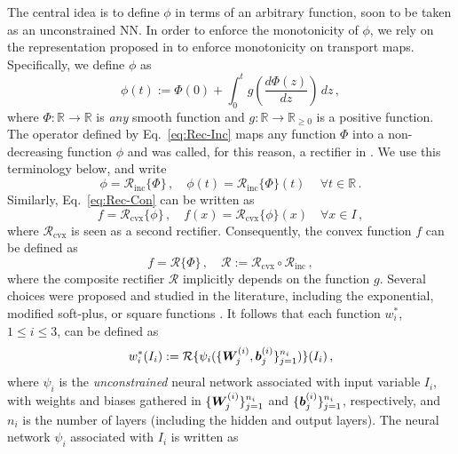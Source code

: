 The central idea is to define $\phi$ in terms of an arbitrary function, soon to be taken as an unconstrained NN. In order to enforce the monotonicity of $\phi$, we rely on the representation proposed in \cite{baptista2020adaptive} to enforce monotonicity on transport maps. Specifically, we define $\phi$ as
\begin{equation}\label{eq:Rec-Inc}
    \phi(t) := \Phi(0) + \int_{0}^{t} g\left(\frac{d\Phi(z)}{dz}\right)\,dz\,,
\end{equation}
where $\Phi:\mathbb{R} \to \mathbb{R}$ is \textit{any} smooth function and $g:\mathbb{R} \to \mathbb{R}_{\geq 0}$ is a positive function. The operator defined by Eq.~\eqref{eq:Rec-Inc} maps any function $\Phi$ into a non-decreasing function $\phi$ and was called, for this reason, a rectifier in \cite{baptista2020adaptive}. We use this terminology below, and write 
\begin{equation}
    \phi = \mathcal{R}_{\mathrm{inc}}\{\Phi\}\,, \quad \phi(t) = \mathcal{R}_{\mathrm{inc}}\{\Phi\}(t) \, \quad \forall t \in \mathbb{R}\,.
\end{equation}
Similarly, Eq.~\eqref{eq:Rec-Con} can be written as 
\begin{equation}
    f = \mathcal{R}_{\mathrm{cvx}}\{\phi\}\,, \quad f(x) = \mathcal{R}_{\mathrm{cvx}}\{\phi\}(x) \quad \forall x \in I\,,
\end{equation}
where $\mathcal{R}_{\mathrm{cvx}}$ is seen as a second rectifier. Consequently, the convex function $f$ can be defined as
\begin{equation}
    f = \mathcal{R}\{\Phi\}\,, \quad \mathcal{R} := \mathcal{R}_{\mathrm{cvx}} \circ \mathcal{R}_{\mathrm{inc}}\,,
\end{equation}
where the composite rectifier $\mathcal{R}$ implicitly depends on the function $g$. Several choices were proposed and studied in the literature, including the exponential, modified soft-plus, or square functions \cite{baptista2020adaptive}. It follows that each function $w_i^*$, $1 \leq i \leq 3$, can be defined as
\begin{equation}\label{eq:def-wistar}
    w_i^*(I_i) := \mathcal{R}\{\psi_i(\{\boldsymbol{W}_j^{(i)}, \boldsymbol{b}_j^{(i)}\}_{j = 1}^{n_i})\}(I_i)\,, 
\end{equation}
where $\psi_i$ is the \textit{unconstrained} neural network associated with input variable $I_i$, with weights and biases gathered in $\{\boldsymbol{W}_j^{(i)}\}_{j = 1}^{n_i}$ and $\{\boldsymbol{b}_j^{(i)}\}_{j = 1}^{n_i}$, respectively, and $n_i$ is the number of layers (including the hidden and output layers). The neural network $\psi_i$ associated with $I_i$ is written as
